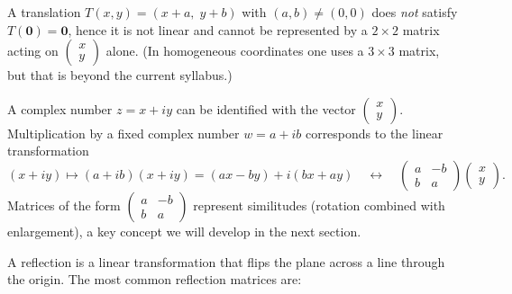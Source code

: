 \documentclass[11pt]{article}
\newcommand{\cle}[1]{{\popxbold\color{popdark}#1}}
\newcounter{popsec}
\newcounter{popsub}
\newcommand{\courssub}[1]{%
  \stepcounter{popsub}%
  \par\vspace{9pt}\noindent{\popxbold\fontsize{11.5}{13}\selectfont\color{popink}{\color{poporange}\thepopsec.\thepopsub}\hspace{6pt}#1}\par\nopagebreak\vspace{4pt}
}
\begin{document}
\begin{attention}
A translation $T(x,y) = (x + a,\; y + b)$ with $(a,b) \neq (0,0)$ does \emph{not} satisfy $T(\mathbf{0}) = \mathbf{0}$, hence it is not linear and cannot be represented by a $2 \times 2$ matrix acting on $\begin{pmatrix} x \\ y \end{pmatrix}$ alone. (In homogeneous coordinates one uses a $3 \times 3$ matrix, but that is beyond the current syllabus.)
\end{attention}

\begin{savaistu}
A complex number $z = x+iy$ can be identified with the vector $\begin{pmatrix} x \\ y \end{pmatrix}$. Multiplication by a fixed complex number $w = a+ib$ corresponds to the linear transformation
\[
(x+iy) \mapsto (a+ib)(x+iy) = (ax-by) + i(bx+ay)
\quad\longleftrightarrow\quad
\begin{pmatrix} a & -b \\ b & a \end{pmatrix}
\begin{pmatrix} x \\ y \end{pmatrix}.
\]
Matrices of the form $\begin{pmatrix} a & -b \\ b & a \end{pmatrix}$ represent \cle{similitudes} (rotation combined with enlargement), a key concept we will develop in the next section.
\end{savaistu}

\courssub{Reflections}

A reflection is a linear transformation that flips the plane across a line through the origin. The most common reflection matrices are:
\end{document}
